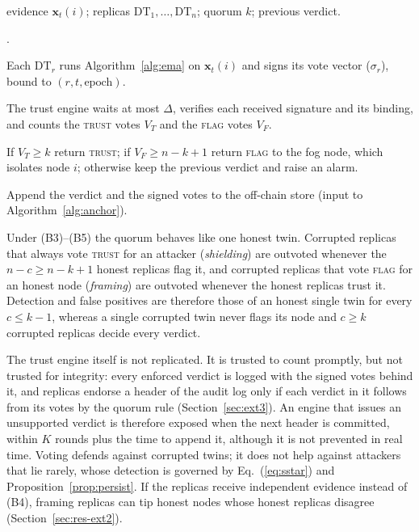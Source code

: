 \documentclass[lineno,pdflatex,sn-nature]{sn-jnl}
\theoremstyle{thmstyleone}%
\theoremstyle{thmstylethree}%
\begin{document}
\begin{algorithm}[!t]
\caption{Per-round vote for node $i$.}
\label{alg:vote}
 evidence $\mathbf{x}_t(i)$; replicas
$\mathrm{DT}_1,\dots,\mathrm{DT}_n$; quorum $k$; previous verdict.

\begin{list}{.}{\setlength{\topsep}{1pt}\setlength{\partopsep}{0pt}\setlength{\itemsep}{0pt}\setlength{\parsep}{0pt}\setlength{\leftmargin}{1.6em}\setlength{\labelwidth}{1.2em}\setlength{\labelsep}{0.4em}}
  \item Each $\mathrm{DT}_r$ runs Algorithm~\ref{alg:ema} on
        $\mathbf{x}_t(i)$ and signs its vote vector ($\sigma_r$),
        bound to $(r,t,\text{epoch})$.
  \item The trust engine waits at most $\Delta$, verifies each received
        signature and its binding, and counts the \textsc{trust} votes
        $V_T$ and the \textsc{flag} votes $V_F$.
  \item If $V_T\geq k$ return \textsc{trust}; if $V_F\geq n-k+1$ return
        \textsc{flag} to the fog node, which isolates node $i$;
        otherwise keep the previous verdict and raise an alarm.
  \item Append the verdict and the signed votes to the off-chain store
        (input to Algorithm~\ref{alg:anchor}).
\end{list}\vspace{-2pt}
\end{algorithm}

Under (B3)--(B5) the quorum behaves like one honest twin.  Corrupted
replicas that always vote \textsc{trust} for an attacker
(\emph{shielding}) are outvoted whenever the $n-c\geq n-k+1$ honest
replicas flag it, and corrupted replicas that vote \textsc{flag} for an
honest node (\emph{framing}) are outvoted whenever the honest replicas
trust it.  Detection and false positives are therefore those of an
honest single twin for every $c\le k-1$, whereas a single corrupted
twin never flags its node and $c\geq k$ corrupted replicas decide every
verdict.

The trust engine itself is not replicated.  It is trusted to count
promptly, but not trusted for integrity: every enforced verdict is
logged with the signed votes behind it, and replicas endorse a header
of the audit log only if each verdict in it follows from its votes by
the quorum rule (Section~\ref{sec:ext3}).  An engine that issues an
unsupported verdict is therefore exposed when the next header is
committed, within $K$ rounds plus the time to append it, although it
is not prevented in real time.  Voting defends
against corrupted twins; it does not help against attackers that lie
rarely, whose detection is governed by
Eq.~(\ref{eq:sstar}) and Proposition~\ref{prop:persist}.
If the replicas receive independent evidence instead of (B4), framing
replicas can tip honest nodes whose honest replicas disagree
(Section~\ref{sec:res-ext2}).
\end{document}
